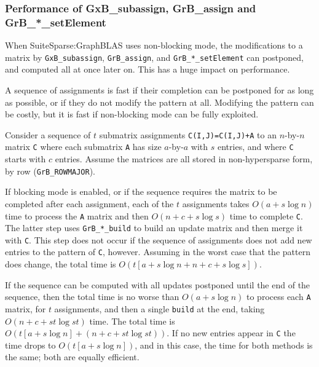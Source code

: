 \documentclass[12pt]{article}
\begin{document}
\newpage
\subsubsection{Performance of {\sf GxB\_subassign}, {\sf GrB\_assign}
and {\sf GrB\_*\_setElement}}

When SuiteSparse:GraphBLAS uses non-blocking mode, the modifications to a
matrix by \verb'GxB_subassign', \verb'GrB_assign', and \verb'GrB_*_setElement'
can postponed, and computed all at once later on.  This has a huge impact on
performance.

A sequence of assignments is fast if their completion can be postponed for as
long as possible, or if they do not modify the pattern at all.  Modifying the
pattern can be costly, but it is fast if non-blocking mode can be fully
exploited.

Consider a sequence of $t$ submatrix assignments \verb'C(I,J)=C(I,J)+A' to an
$n$-by-$n$ matrix \verb'C' where each submatrix \verb'A' has size $a$-by-$a$
with $s$ entries, and where \verb'C' starts with $c$ entries.
Assume the matrices are all stored in non-hypersparse form, by row
(\verb'GrB_ROWMAJOR').

If blocking mode is enabled, or if the sequence requires the matrix to be
completed after each assignment, each of the $t$ assignments takes $O(a + s
\log n)$ time to process the \verb'A' matrix and then $O(n + c + s \log s)$
time to complete \verb'C'.  The latter step uses \verb'GrB_*_build' to build an
update matrix and then merge it with \verb'C'.  This step does not occur if the
sequence of assignments does not add new entries to the pattern of \verb'C',
however.  Assuming in the worst case that the pattern does change, the total
time is $O (t \left[ a + s \log n + n + c + s \log s \right] )$.

If the sequence can be computed with all updates postponed until the end of the
sequence, then the total time is no worse than $O(a + s \log n)$ to process
each \verb'A' matrix, for $t$ assignments, and then a single \verb'build' at
the end, taking $O(n + c + st \log st)$ time.
The total time is $O (t \left [a + s \log n \right] + (n + c + st \log st))$.
If no new entries appear in
\verb'C' the time drops to $O (t \left [a + s \log n \right])$, and in this
case, the time for both methods is the same; both are equally efficient.
\end{document}
